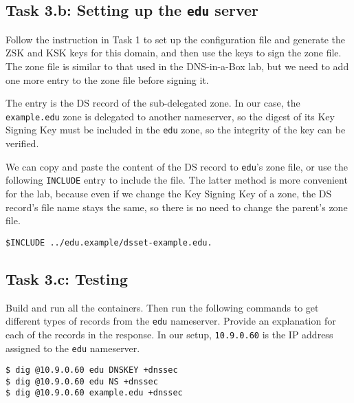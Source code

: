 \subsection{Task 3.b: Setting up the \texttt{edu} server} 

Follow the instruction in Task 1 to set up the configuration 
file and generate the ZSK and KSK keys 
for this domain, and then use the keys to sign
the zone file. The zone file is similar to that used 
in the DNS-in-a-Box lab, but we need to add one more 
entry to the zone file before signing it. 


The entry is the DS record of the sub-delegated zone. 
In our case, the \texttt{example.edu} zone is delegated to 
another nameserver, so the digest of its Key Signing Key must 
be included in the \texttt{edu} zone, so the 
integrity of the key can be verified. 


We can copy and paste the content of the DS record to 
\texttt{edu}'s zone file, or use the following
\texttt{INCLUDE} entry to include the file. The latter 
method is more convenient for the lab, because even if we 
change the Key Signing Key of a zone, the DS record's file name stays the same,
so there is no need to change the parent's zone file.

\begin{lstlisting}
$INCLUDE ../edu.example/dsset-example.edu.
\end{lstlisting}
 



\subsection{Task 3.c: Testing} 

Build and run all the containers. Then
run the following commands to get different types of records
from the \texttt{edu} nameserver. Provide an explanation
for each of the records in the response. 
In our setup, \texttt{10.9.0.60} is the IP address 
assigned to the \texttt{edu} nameserver.


\begin{lstlisting}
$ dig @10.9.0.60 edu DNSKEY +dnssec
$ dig @10.9.0.60 edu NS +dnssec
$ dig @10.9.0.60 example.edu +dnssec
\end{lstlisting}




